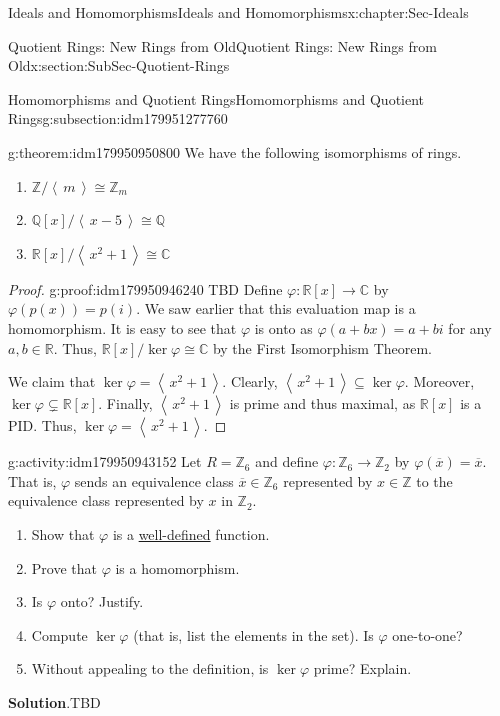\documentclass[oneside,10pt,]{book}
\newcommand{\blocktitlefont}{\relax}
\newcommand{\xreffont}{\relax}
\numberwithin{equation}{section}
\newcommand{\ideal}[1]{\left\langle\, #1 \,\right\rangle}
\def\p{\varphi}
\def\C{{\mathbb C}}
\def\Z{{\mathbb Z}}
\def\Q{{\mathbb Q}}
\def\R{{\mathbb R}}
\begin{document}
\begin{chapterptx}{Ideals and Homomorphisms}{}{Ideals and Homomorphisms}{}{}{x:chapter:Sec-Ideals}
\begin{sectionptx}{Quotient Rings: New Rings from Old}{}{Quotient Rings: New Rings from Old}{}{}{x:section:SubSec-Quotient-Rings}
\begin{subsectionptx}{Homomorphisms and Quotient Rings}{}{Homomorphisms and Quotient Rings}{}{}{g:subsection:idm179951277760}
\begin{theorem}{}{}{g:theorem:idm179950950800}%
We have the following isomorphisms of rings.%
\begin{enumerate}
\item{}\(\Z/\ideal{m} \cong \Z_m\)%
\item{}\(\Q[x]/\ideal{x-5} \cong \Q\)%
\item{}\(\R[x]/\ideal{x^2+1} \cong \C\)%
\end{enumerate}
%
\end{theorem}
\begin{proof}{}{g:proof:idm179950946240}
TBD Define \(\p: \R[x] \to \C\) by \(\p(p(x)) = p(i)\). We saw earlier that this evaluation map is a homomorphism. It is easy to see that \(\p\) is onto as \(\p(a+bx) = a+bi\) for any \(a,b\in \R\). Thus, \(\R[x]/\ker\p \cong \C\) by the First Isomorphism Theorem.%
\par
We claim that \(\ker\p = \ideal{x^2+1}\). Clearly, \(\ideal{x^2+1} \subseteq \ker\p\). Moreover, \(\ker\p \subsetneq \R[x]\). Finally, \(\ideal{x^2+1}\) is prime and thus maximal, as \(\R[x]\) is a PID. Thus, \(\ker\p = \ideal{x^2+1}\).%
\end{proof}
\begin{activity}{}{g:activity:idm179950943152}%
Let \(R = \Z_6\) and define \(\p : \Z_6 \to \Z_2\) by \(\p(\overline{x}) = \overline{x}\). That is, \(\p\) sends an equivalence class \(\overline{x}\in \Z_6\) represented by \(x\in \Z\) to the equivalence class represented by \(x\) in \(\Z_2\).%
%
\begin{enumerate}
\item{}Show that \(\p\) is a \hyperref[x:definition:def-well-defined]{well-defined} function.%
\item{}Prove that \(\p\) is a homomorphism.%
\item{}Is \(\p\) onto? Justify.%
\item{}Compute \(\ker\p\) (that is, list the elements in the set). Is \(\p\) one-to-one?%
\item{}Without appealing to the definition, is \(\ker\p\) prime? Explain.%
\end{enumerate}
\par\smallskip%
\noindent\textbf{\blocktitlefont Solution}.\hypertarget{g:solution:idm179950817184}{}\quad{}TBD\end{activity}
\end{subsectionptx}
\end{sectionptx}
\end{chapterptx}
%
\backmatter
%
%
%
%
{\xreffont\printindex}
%
\end{document}
